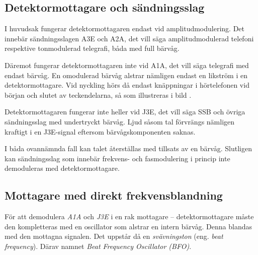 

\newpage


\subsection{Detektormottagare och sändningsslag}

I huvudsak fungerar detektormottagaren endast vid amplitudmodulering.
Det innebär sändningsslagen A3E och A2A, det vill säga amplitudmodulerad
telefoni respektive tonmodulerad telegrafi, båda med full bärvåg.

Däremot fungerar detektormottagaren inte vid A1A, det vill säga telegrafi med
endast bärvåg.
En omodulerad bärvåg alstrar nämligen endast en likström i en
detektormottagare.
Vid nyckling hörs då endast knäppningar i hörtelefonen vid början och
slutet av teckendelarna, så som illustreras i bild .

Detektormottagaren fungerar inte heller vid J3E, det vill säga SSB och övriga
sändningsslag med undertryckt bärvåg.
Ljud såsom tal förvrängs nämligen kraftigt i en J3E-signal eftersom
bärvågskomponenten saknas.

I båda ovannämnda fall kan talet återställas med tillsats av en bärvåg.
Slutligen kan sändningsslag som innebär frekvens- och fasmodulering i
princip inte demoduleras med detektormottagare.

\newpage
{}

\subsection{Mottagare med direkt frekvensblandning}

För att demodulera \emph{A1A} och \emph{J3E} i en rak mottagare --
detektormottagare måste den kompletteras med en oscillator som alstrar en
intern bärvåg.
Denna blandas med den mottagna signalen.
Det uppstår då en \emph{svävningston} (eng. \emph{beat frequency}).
Därav namnet \emph{Beat Frequency Oscillator (BFO)}.

